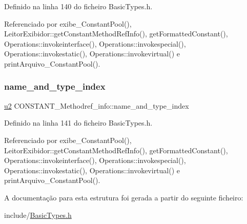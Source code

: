 Definido na linha 140 do ficheiro Basic\+Types.\+h.



Referenciado por exibe\+\_\+\+Constant\+Pool(), Leitor\+Exibidor\+::get\+Constant\+Method\+Ref\+Info(), get\+Formatted\+Constant(), Operations\+::invokeinterface(), Operations\+::invokespecial(), Operations\+::invokestatic(), Operations\+::invokevirtual() e print\+Arquivo\+\_\+\+Constant\+Pool().

\mbox{\label{structCONSTANT__Methodref__info_aa5933f9d2469d4be22a19960bb25da5e}} 
\subsubsection{\texorpdfstring{name\+\_\+and\+\_\+type\+\_\+index}{name\_and\_type\_index}}
{\footnotesize\ttfamily \hyperlink{BasicTypes_8h_a732cde1300aafb73b0ea6c2558a7a54f}{u2} C\+O\+N\+S\+T\+A\+N\+T\+\_\+\+Methodref\+\_\+info\+::name\+\_\+and\+\_\+type\+\_\+index}



Definido na linha 141 do ficheiro Basic\+Types.\+h.



Referenciado por exibe\+\_\+\+Constant\+Pool(), Leitor\+Exibidor\+::get\+Constant\+Method\+Ref\+Info(), get\+Formatted\+Constant(), Operations\+::invokeinterface(), Operations\+::invokespecial(), Operations\+::invokestatic(), Operations\+::invokevirtual() e print\+Arquivo\+\_\+\+Constant\+Pool().



A documentação para esta estrutura foi gerada a partir do seguinte ficheiro\+:\begin{DoxyCompactItemize}
\item 
include/\hyperlink{BasicTypes_8h}{Basic\+Types.\+h}\end{DoxyCompactItemize}
